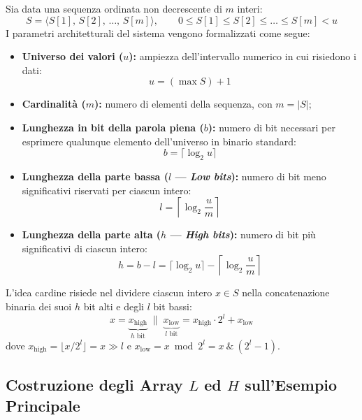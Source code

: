 Sia data una sequenza ordinata non decrescente di $m$ interi:
\begin{equation}
  S = \langle S[1], \, S[2], \, \dots, \, S[m] \rangle, \qquad 0 \le S[1] \le S[2] \le \dots \le S[m] < u
\end{equation}
I parametri architetturali del sistema vengono formalizzati come segue:
\begin{itemize}
  \item \textbf{Universo dei valori ($u$):} ampiezza dell'intervallo numerico in cui risiedono i dati:
  \begin{equation}
    u = (\max S) + 1
  \end{equation}
  \item \textbf{Cardinalit\`a ($m$):} numero di elementi della sequenza, con $m = |S|$;
  \item \textbf{Lunghezza in bit della parola piena ($b$):} numero di bit necessari per esprimere qualunque elemento dell'universo in binario standard:
  \begin{equation}
    b = \lceil \log_2 u \rceil
  \end{equation}
  \item \textbf{Lunghezza della parte bassa ($l$ — \textit{Low bits}):} numero di bit meno significativi riservati per ciascun intero:
  \begin{equation}
    l = \left\lceil \log_2 \frac{u}{m} \right\rceil
  \end{equation}
  \item \textbf{Lunghezza della parte alta ($h$ — \textit{High bits}):} numero di bit pi\`u significativi di ciascun intero:
  \begin{equation}
    h = b - l = \lceil \log_2 u \rceil - \left\lceil \log_2 \frac{u}{m} \right\rceil
  \end{equation}
\end{itemize}

L'idea cardine risiede nel dividere ciascun intero $x \in S$ nella concatenazione binaria dei suoi $h$ bit alti e degli $l$ bit bassi:
\begin{equation}
  x = \underbrace{x_{\text{high}}}_{h \text{ bit}} \;\|\; \underbrace{x_{\text{low}}}_{l \text{ bit}} = x_{\text{high}} \cdot 2^l + x_{\text{low}}
\end{equation}
dove $x_{\text{high}} = \lfloor x / 2^l \rfloor = x \gg l$ e $x_{\text{low}} = x \bmod 2^l = x \ \& \ (2^l - 1)$.

\FloatBarrier
\subsection{Costruzione degli Array $L$ ed $H$ sull'Esempio Principale}
\label{subsec:costruzione-array-lh}

